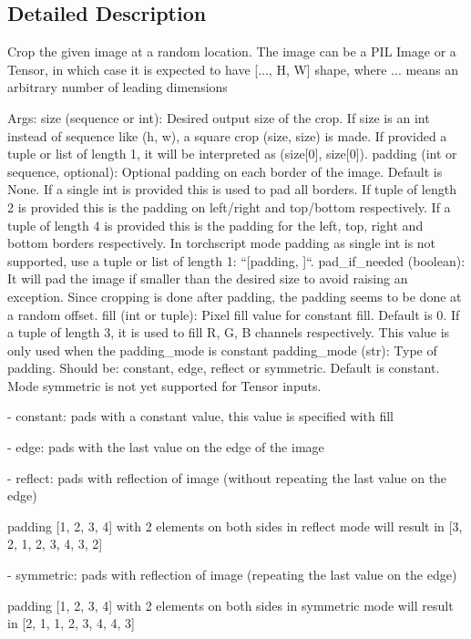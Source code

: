 \subsection{Detailed Description}
\begin{DoxyVerb}Crop the given image at a random location.
The image can be a PIL Image or a Tensor, in which case it is expected
to have [..., H, W] shape, where ... means an arbitrary number of leading
dimensions

Args:
    size (sequence or int): Desired output size of the crop. If size is an
        int instead of sequence like (h, w), a square crop (size, size) is
        made. If provided a tuple or list of length 1, it will be interpreted as (size[0], size[0]).
    padding (int or sequence, optional): Optional padding on each border
        of the image. Default is None. If a single int is provided this
        is used to pad all borders. If tuple of length 2 is provided this is the padding
        on left/right and top/bottom respectively. If a tuple of length 4 is provided
        this is the padding for the left, top, right and bottom borders respectively.
        In torchscript mode padding as single int is not supported, use a tuple or
        list of length 1: ``[padding, ]``.
    pad_if_needed (boolean): It will pad the image if smaller than the
        desired size to avoid raising an exception. Since cropping is done
        after padding, the padding seems to be done at a random offset.
    fill (int or tuple): Pixel fill value for constant fill. Default is 0. If a tuple of
        length 3, it is used to fill R, G, B channels respectively.
        This value is only used when the padding_mode is constant
    padding_mode (str): Type of padding. Should be: constant, edge, reflect or symmetric. Default is constant.
        Mode symmetric is not yet supported for Tensor inputs.

         - constant: pads with a constant value, this value is specified with fill

         - edge: pads with the last value on the edge of the image

         - reflect: pads with reflection of image (without repeating the last value on the edge)

            padding [1, 2, 3, 4] with 2 elements on both sides in reflect mode
            will result in [3, 2, 1, 2, 3, 4, 3, 2]

         - symmetric: pads with reflection of image (repeating the last value on the edge)

            padding [1, 2, 3, 4] with 2 elements on both sides in symmetric mode
            will result in [2, 1, 1, 2, 3, 4, 4, 3]\end{DoxyVerb}
 

